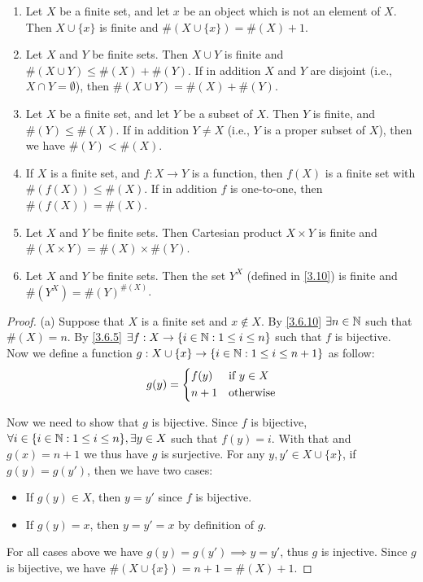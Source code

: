 \begin{prop}\label{3.6.14}
  \leavevmode
  \begin{enumerate}
    \item Let \(X\) be a finite set, and let \(x\) be an object which is not an element of \(X\).
          Then \(X \cup \{x\}\) is finite and \(\#(X \cup \{x\}) = \#(X) + 1\).
    \item Let \(X\) and \(Y\) be finite sets.
          Then \(X \cup Y\) is finite and \(\#(X \cup Y) \leq \#(X) + \#(Y)\).
          If in addition \(X\) and \(Y\) are disjoint (i.e., \(X \cap Y = \emptyset\)), then \(\#(X \cup Y) = \#(X) + \#(Y)\).
    \item Let \(X\) be a finite set, and let \(Y\) be a subset of \(X\).
          Then \(Y\) is finite, and \(\#(Y) \leq \#(X)\).
          If in addition \(Y \neq X\) (i.e., \(Y\) is a proper subset of \(X\)), then we have \(\#(Y) < \#(X)\).
    \item If \(X\) is a finite set, and \(f : X \to Y\) is a function, then \(f(X)\) is a finite set with \(\#(f(X)) \leq \#(X)\).
          If in addition \(f\) is one-to-one, then \(\#(f(X)) = \#(X)\).
    \item Let \(X\) and \(Y\) be finite sets.
          Then Cartesian product \(X \times Y\) is finite and \(\#(X \times Y) = \#(X) \times \#(Y)\).
    \item Let \(X\) and \(Y\) be finite sets.
          Then the set \(Y^X\) (defined in \cref{3.10}) is finite and \(\#(Y^X) = \#(Y)^{\#(X)}\).
  \end{enumerate}
\end{prop}

\begin{proof}{(a)}
  Suppose that \(X\) is a finite set and \(x \notin X\).
  By \cref{3.6.10} \(\exists n \in \mathbb{N}\) such that \(\#(X) = n\).
  By \cref{3.6.5} \(\exists f : X \to \{i \in \mathbb{N} : 1 \leq i \leq n\}\) such that \(f\) is bijective.
  Now we define a function \(g : X \cup \{x\} \to \{i \in \mathbb{N} : 1 \leq i \leq n + 1\}\) as follow:
  \[
    g(y) = \begin{dcases}
      f(y)  & \text{if } y \in X \\
      n + 1 & \text{otherwise}
    \end{dcases}
  \]

  Now we need to show that \(g\) is bijective.
  Since \(f\) is bijective, \(\forall i \in \{i \in \mathbb{N} : 1 \leq i \leq n\}, \exists y \in X\) such that \(f(y) = i\).
  With that and \(g(x) = n + 1\) we thus have \(g\) is surjective.
  For any \(y, y' \in X \cup \{x\}\), if \(g(y) = g(y')\), then we have two cases:
  \begin{itemize}
    \item If \(g(y) \in X\), then \(y = y'\) since \(f\) is bijective.
    \item If \(g(y) = x\), then \(y = y' = x\) by definition of \(g\).
  \end{itemize}
  For all cases above we have \(g(y) = g(y') \implies y = y'\), thus \(g\) is injective.
  Since \(g\) is bijective, we have \(\#(X \cup \{x\}) = n + 1 = \#(X) + 1\).
\end{proof}

